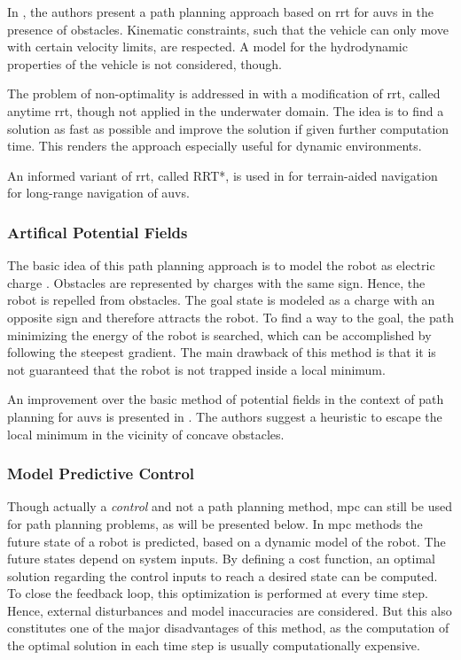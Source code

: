 In \cite{Young13}, the authors present a path planning approach based on \ac{rrt} for \acp{auv} in the presence of obstacles. Kinematic constraints, such that the vehicle can only move with certain velocity limits, are respected. A model for the hydrodynamic properties of the vehicle is not considered, though.

The problem of non-optimality is addressed in \cite{Karaman11} with a modification of \ac{rrt}, called anytime \ac{rrt}, though not applied in the underwater domain. The idea is to find a solution as fast as possible and improve the solution if given further computation time. This renders the approach especially useful for dynamic environments.

An informed variant of \ac{rrt}, called RRT*, is used in \cite{Ma18} for terrain-aided navigation for long-range navigation of \acp{auv}.

\subsubsection{Artifical Potential Fields}
The basic idea of this path planning approach is to model the robot as electric charge \cite{Gomez15}. Obstacles are represented by charges with the same sign. Hence, the robot is repelled from obstacles. The goal state is modeled as a charge with an opposite sign and therefore attracts the robot. To find a way to the goal, the path minimizing the energy of the robot is searched, which can be accomplished by following the steepest gradient. The main drawback of this method is that it is not guaranteed that the robot is not trapped inside a local minimum. 

An improvement over the basic method of potential fields in the context of path planning for \acp{auv} is presented in \cite{Fu-guang05}. The authors suggest a heuristic to escape the local minimum in the vicinity of concave obstacles.

\subsubsection{Model Predictive Control}

Though actually a \textit{control} and not a path planning method, \ac{mpc} can still be used for path planning problems, as will be presented below. In \ac{mpc} methods the future state of a robot is predicted, based on a dynamic model of the robot. The future states depend on system inputs. By defining a cost function, an optimal solution regarding the control inputs to reach a desired state can be computed. To close the feedback loop, this optimization is performed at every time step. Hence, external disturbances and model inaccuracies are considered. But this also constitutes one of the major disadvantages of this method, as the computation of the optimal solution in each time step is usually computationally expensive.

